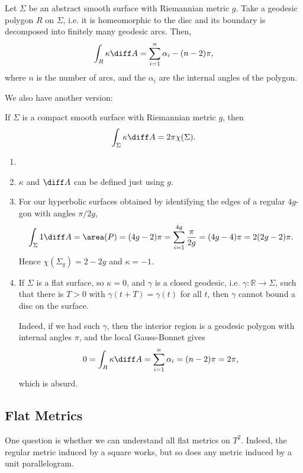 \documentclass[12pt]{article}
\begin{document}
\begin{theorem}
	Let $\Sigma$ be an abstract smooth surface with Riemannian metric $g$. Take a geodesic polygon $R$ on $\Sigma$, i.e. it is homeomorphic to the disc and its boundary is decomposed into finitely many geodesic arcs. Then,
	\[
		\int_R \kappa \diff A =  \sum_{i=1}^n \alpha_i - (n-2)\pi,
	\]
	where $n$ is the number of arcs, and the $\alpha_i$ are the internal angles of the polygon.
\end{theorem}

We also have another version:
\begin{theorem}
	If $\Sigma$ is a compact smooth surface with Riemannian metric $g$, then
	\[
	\int_\Sigma \kappa \diff A = 2 \pi \chi(\Sigma).
	\]
\end{theorem}

\begin{remark}
	\begin{enumerate}
		\item[]
		\item $\kappa$ and $\diff A$ can be defined just using $g$.
		\item For our hyperbolic surfaces obtained by identifying the edges of a regular $4g$-gon with angles $\pi/2g$,
			\[
				\int_\Sigma 1 \diff A = \area (P) = (4g - 2)\pi = \sum_{i=1}^{4g} \frac{\pi}{2g} = (4g - 4)\pi = 2(2g - 2)\pi.
			\]
			Hence $\chi(\Sigma_g) = 2-2g$ and $\kappa = -1$.
		\item If $\Sigma$ is a flat surface, so $\kappa = 0$, and $\gamma$ is a closed geodesic, i.e. $\gamma : \mathbb{R} \to \Sigma$, such that there is $T > 0$ with $\gamma(t + T) = \gamma(t)$ for all $t$, then $\gamma$ cannot bound a disc on the surface.

			Indeed, if we had such $\gamma$, then the interior region is a geodesic polygon with internal angles $\pi$, and the local Gauss-Bonnet gives
			\[
				0 = \int_R \kappa \diff A = \sum_{i=1}^n \alpha_i = (n-2)\pi = 2 \pi,
			\]
			which is absurd.
	\end{enumerate}
\end{remark}

\subsection{Flat Metrics}
\label{sub:flat_metrics}

One question is whether we can understand all flat metrics on $T^2$. Indeed, the regular metric induced by a square works, but so does any metric induced by a unit parallelogram.
\end{document}
